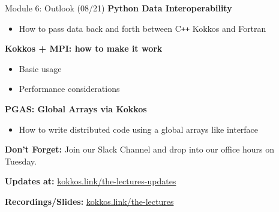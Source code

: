 \begin{frame}{Module 6: Outlook (08/21)}
    \vspace{-3pt}
	\textbf{Python Data Interoperability}
	\begin{itemize}
        \item {How to pass data back and forth between C\texttt{++} Kokkos and Fortran}
	\end{itemize}
	
	\vspace{5pt}
	\textbf{Kokkos + MPI: how to make it work}
	\begin{itemize}
		\item {Basic usage}
		\item {Performance considerations}
	\end{itemize}

	\vspace{5pt}
	\textbf{PGAS: Global Arrays via Kokkos}
	\begin{itemize}
		\item {How to write distributed code using a global arrays like interface}
	\end{itemize}

	\vspace{5pt}
	\textbf{Don't Forget:} Join our Slack Channel and drop into our office hours on Tuesday.
	
	\vspace{5pt}
	\textbf{Updates at:} \href{https://kokkos.link/the-lectures-updates}{kokkos.link/the-lectures-updates}
	
	\vspace{5pt}
	\textbf{Recordings/Slides:} \href{https://kokkos.link/the-lectures}{kokkos.link/the-lectures}

\end{frame}





